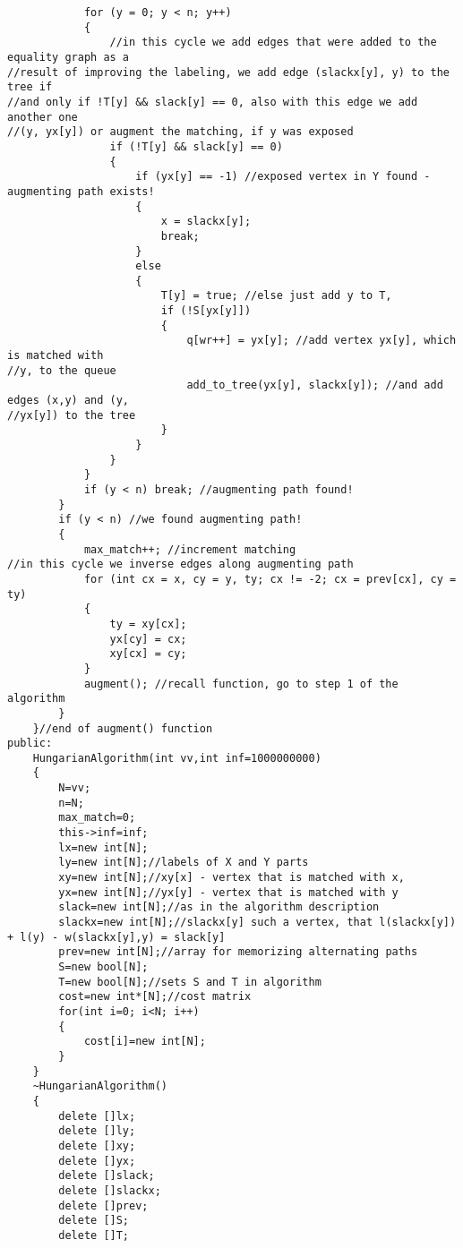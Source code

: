\documentclass{article}
\begin{document}
\begin{multicols}{3}[]
\begin{verbatim}
            for (y = 0; y < n; y++)
            {
                //in this cycle we add edges that were added to the equality graph as a
//result of improving the labeling, we add edge (slackx[y], y) to the tree if
//and only if !T[y] && slack[y] == 0, also with this edge we add another one
//(y, yx[y]) or augment the matching, if y was exposed
                if (!T[y] && slack[y] == 0)
                {
                    if (yx[y] == -1) //exposed vertex in Y found - augmenting path exists!
                    {
                        x = slackx[y];
                        break;
                    }
                    else
                    {
                        T[y] = true; //else just add y to T,
                        if (!S[yx[y]])
                        {
                            q[wr++] = yx[y]; //add vertex yx[y], which is matched with
//y, to the queue
                            add_to_tree(yx[y], slackx[y]); //and add edges (x,y) and (y,
//yx[y]) to the tree
                        }
                    }
                }
            }
            if (y < n) break; //augmenting path found!
        }
        if (y < n) //we found augmenting path!
        {
            max_match++; //increment matching
//in this cycle we inverse edges along augmenting path
            for (int cx = x, cy = y, ty; cx != -2; cx = prev[cx], cy = ty)
            {
                ty = xy[cx];
                yx[cy] = cx;
                xy[cx] = cy;
            }
            augment(); //recall function, go to step 1 of the algorithm
        }
    }//end of augment() function
public:
    HungarianAlgorithm(int vv,int inf=1000000000)
    {
        N=vv;
        n=N;
        max_match=0;
        this->inf=inf;
        lx=new int[N];
        ly=new int[N];//labels of X and Y parts
        xy=new int[N];//xy[x] - vertex that is matched with x,
        yx=new int[N];//yx[y] - vertex that is matched with y
        slack=new int[N];//as in the algorithm description
        slackx=new int[N];//slackx[y] such a vertex, that l(slackx[y]) + l(y) - w(slackx[y],y) = slack[y]
        prev=new int[N];//array for memorizing alternating paths
        S=new bool[N];
        T=new bool[N];//sets S and T in algorithm
        cost=new int*[N];//cost matrix
        for(int i=0; i<N; i++)
        {
            cost[i]=new int[N];
        }
    }
    ~HungarianAlgorithm()
    {
        delete []lx;
        delete []ly;
        delete []xy;
        delete []yx;
        delete []slack;
        delete []slackx;
        delete []prev;
        delete []S;
        delete []T;

\end{verbatim}
\end{multicols}
\end{document}
